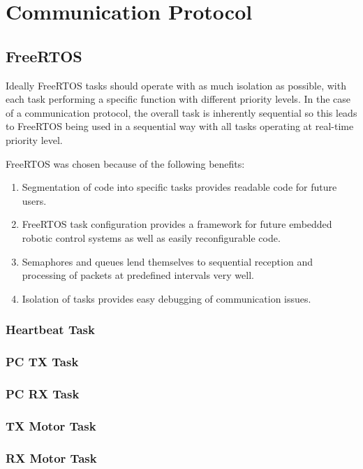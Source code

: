 \chapter{Communication Protocol}

\section{FreeRTOS}

Ideally FreeRTOS tasks should operate with as much isolation as possible, with each task performing a specific function with different priority levels. In the case of a communication protocol, the overall task is inherently sequential so this leads to FreeRTOS being used in a sequential way with all tasks operating at real-time priority level. 

FreeRTOS was chosen because of the following benefits:

\begin{enumerate}
\item Segmentation of code into specific tasks provides readable code for future users.
\item FreeRTOS task configuration provides a framework for future embedded robotic control systems as well as easily reconfigurable code.
\item Semaphores and queues lend themselves to sequential reception and processing of packets at predefined intervals very well.
\item Isolation of tasks provides easy debugging of communication issues.
\end{enumerate}

\subsection{Heartbeat Task}
\subsection{PC TX Task}
\subsection{PC RX Task}
\subsection{TX Motor Task}
\subsection{RX Motor Task}

